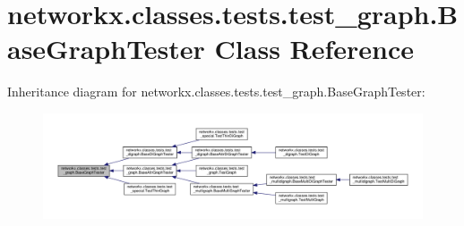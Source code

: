 \hypertarget{classnetworkx_1_1classes_1_1tests_1_1test__graph_1_1BaseGraphTester}{}\section{networkx.\+classes.\+tests.\+test\+\_\+graph.\+Base\+Graph\+Tester Class Reference}
\label{classnetworkx_1_1classes_1_1tests_1_1test__graph_1_1BaseGraphTester}


Inheritance diagram for networkx.\+classes.\+tests.\+test\+\_\+graph.\+Base\+Graph\+Tester\+:
\nopagebreak
\begin{figure}[H]
\begin{center}
\leavevmode
\includegraphics[width=350pt]{classnetworkx_1_1classes_1_1tests_1_1test__graph_1_1BaseGraphTester__inherit__graph}
\end{center}
\end{figure}
